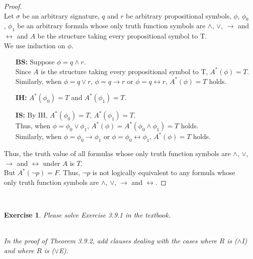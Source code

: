 \documentclass[12pt,a4paper]{article}
\theoremstyle{plain}
\newtheorem{exercise}{Exercise}
\begin{document}
\begin{proof}\ \\
    Let $\sigma$ be an arbitrary signature, $q$ and $r$ be arbitrary propositional symbols, $\phi$, $\phi_0$, $\phi_1$ be an arbitrary formula whose only truth function symbols are $\wedge$, $\vee$, $\rightarrow$ and $\leftrightarrow$ and $A$ be the structure taking every propositional symbol to T.\\
    
    We use induction on $\phi$.
    
    \begin{itemize}
        \item[\textbf{BS:}]
            Suppose $\phi=q \wedge r$.\\
            Since $A$ is the structure taking every propositional symbol to T, $A^*(\phi)=T$.\\
            Similarly, when $\phi=q \vee r$, $\phi=q \to r$ or $\phi=q \leftrightarrow r$, $A^*(\phi)=T$ holds.
        \item[\textbf{IH:}]
            $A^*(\phi_0)=T$ and $A^*(\phi_1)=T$.
        \item[\textbf{IS:}]
            By IH, $A^*(\phi_0)=T$, $A^*(\phi_1)=T$.\\
            Thus, when $\phi=\phi_0 \vee \phi_1$, $A^*(\phi)=A^*(\phi_0 \wedge \phi_1)=T$ holds.\\
            Similarly, when $\phi=\phi_0 \to \phi_1$ or $\phi=\phi_0 \leftrightarrow \phi_1$, $A^*(\phi)=T$ holds.
    \end{itemize}
    Thus, the truth value of all formulas whose only truth function symbols are $\wedge$, $\vee$, $\rightarrow$ and $\leftrightarrow$ under $A$ is $T$.\\
    But $A^*(\neg p)=F$.
    Thus, $\neg p$ is not logically equivalent to any formula whose only truth function symbols are $\wedge$, $\vee$, $\rightarrow$ and $\leftrightarrow$. 
\end{proof}

\ \\
\begin{exercise}
Please solve Exercise 3.9.1 in the textbook.

\ \\
In the proof of Theorem 3.9.2, add clauses dealing with the cases where $R$ is ($\wedge$I) and where $R$ is ($\vee$E).
\end{exercise}
\end{document}
